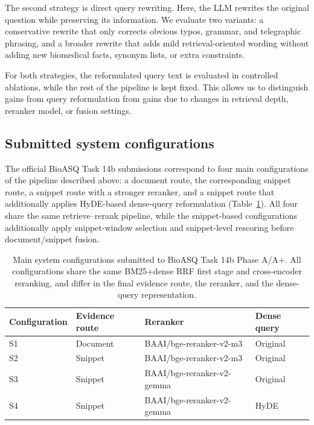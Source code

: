 \documentclass[
]{ceurart}
\begin{document}
The second strategy is direct query rewriting. Here, the LLM rewrites the original question while preserving its information. We evaluate two variants: a conservative rewrite that only corrects obvious typos, grammar, and telegraphic phrasing, and a broader rewrite that adds mild retrieval-oriented wording without adding new biomedical facts, synonym lists, or extra constraints.

For both strategies, the reformulated query text is evaluated in controlled ablations, while the rest of the pipeline is kept fixed. This allows us to distinguish gains from query reformulation from gains due to changes in retrieval depth, reranker model, or fusion settings.

\subsection{Submitted system configurations}
\label{sec:submitted}

The official BioASQ Task 14b submissions correspond to four main configurations of the pipeline described above: a document route, the corresponding snippet route, a snippet route with a stronger reranker, and a snippet route that additionally applies HyDE-based dense-query reformulation (Table~\ref{tab:submitted}). All four share the same retrieve--rerank pipeline, while the snippet-based configurations additionally apply snippet-window selection and snippet-level rescoring before document/snippet fusion.

\begin{table}[!htbp]
  \centering
  \caption{Main system configurations submitted to BioASQ Task 14b Phase A/A+. All configurations share the same BM25+dense RRF first stage and cross-encoder reranking, and differ in the final evidence route, the reranker, and the dense-query representation.}
  \label{tab:submitted}
  \small
  \begin{tabular}{@{}llll@{}}
    \toprule
    Configuration & Evidence route & Reranker & Dense query \\
    \midrule
    S1 & Document & BAAI/bge-reranker-v2-m3    & Original \\
    S2 & Snippet  & BAAI/bge-reranker-v2-m3    & Original \\
    S3 & Snippet  & BAAI/bge-reranker-v2-gemma & Original \\
    S4 & Snippet  & BAAI/bge-reranker-v2-gemma & HyDE     \\
    \bottomrule
  \end{tabular}
\end{table}
\end{document}
